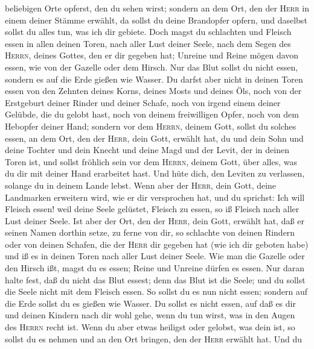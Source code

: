 beliebigen Orte opferst, den du sehen wirst;  sondern an
dem Ort, den der \textsc{Herr} in einem deiner Stämme erwählt, da sollst
du deine Brandopfer opfern, und daselbst sollst du alles tun, was ich
dir gebiete.  Doch magst du schlachten und Fleisch essen
in allen deinen Toren, nach aller Lust deiner Seele, nach dem Segen des
\textsc{Herrn}, deines Gottes, den er dir gegeben hat; Unreine und Reine
mögen davon essen, wie von der Gazelle oder dem Hirsch. 
Nur das Blut sollst du nicht essen, sondern es auf die Erde gießen wie
Wasser.  Du darfst aber nicht in deinen Toren essen von
den Zehnten deines Korns, deines Mosts und deines Öls, noch von der
Erstgeburt deiner Rinder und deiner Schafe, noch von irgend einem deiner
Gelübde, die du gelobt hast, noch von deinem freiwilligen Opfer, noch
von dem Hebopfer deiner Hand;  sondern vor dem
\textsc{Herrn}, deinem Gott, sollst du solches essen, an dem Ort, den
der \textsc{Herr}, dein Gott, erwählt hat, du und dein Sohn und deine
Tochter und dein Knecht und deine Magd und der Levit, der in deinen
Toren ist, und sollst fröhlich sein vor dem \textsc{Herrn}, deinem Gott,
über alles, was du dir mit deiner Hand erarbeitet hast. 
Und hüte dich, den Leviten zu verlassen, solange du in deinem Lande
lebst.  Wenn aber der \textsc{Herr}, dein Gott, deine
Landmarken erweitern wird, wie er dir versprochen hat, und du sprichst:
Ich will Fleisch essen! weil deine Seele gelüstet, Fleisch zu essen, so
iß Fleisch nach aller Lust deiner Seele.  Ist aber der
Ort, den der \textsc{Herr}, dein Gott, erwählt hat, daß er seinen Namen
dorthin setze, zu ferne von dir, so schlachte von deinen Rindern oder
von deinen Schafen, die der \textsc{Herr} dir gegeben hat (wie ich dir
geboten habe) und iß es in deinen Toren nach aller Lust deiner Seele.
 Wie man die Gazelle oder den Hirsch ißt, magst du es
essen; Reine und Unreine dürfen es essen.  Nur daran
halte fest, daß du nicht das Blut essest; denn das Blut ist die Seele;
und du sollst die Seele nicht mit dem Fleisch essen.  So
sollst du es nun nicht essen; sondern auf die Erde sollst du es gießen
wie Wasser.  Du sollst es nicht essen, auf daß es dir und
deinen Kindern nach dir wohl gehe, wenn du tun wirst, was in den Augen
des \textsc{Herrn} recht ist.  Wenn du aber etwas
heiligst oder gelobst, was dein ist, so sollst du es nehmen und an den
Ort bringen, den der \textsc{Herr} erwählt hat.  Und du
